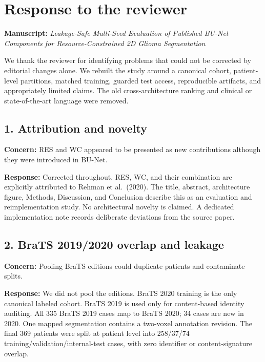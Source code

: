 \documentclass[
  10pt,
  letterpaper,
]{article}
\author{}
\date{}
\begin{document}
\section{Response to the reviewer}\label{response-to-the-reviewer}

\textbf{Manuscript:} \emph{Leakage-Safe Multi-Seed Evaluation of
Published BU-Net Components for Resource-Constrained 2D Glioma
Segmentation}

We thank the reviewer for identifying problems that could not be
corrected by editorial changes alone. We rebuilt the study around a
canonical cohort, patient-level partitions, matched training, guarded
test access, reproducible artifacts, and appropriately limited claims.
The old cross-architecture ranking and clinical or state-of-the-art
language were removed.

\subsection{1. Attribution and novelty}\label{attribution-and-novelty}

\textbf{Concern:} RES and WC appeared to be presented as new
contributions although they were introduced in BU-Net.

\textbf{Response:} Corrected throughout. RES, WC, and their combination
are explicitly attributed to Rehman et al.~(2020). The title, abstract,
architecture figure, Methods, Discussion, and Conclusion describe this
as an evaluation and reimplementation study. No architectural novelty is
claimed. A dedicated implementation note records deliberate deviations
from the source paper.

\subsection{2. BraTS 2019/2020 overlap and
leakage}\label{brats-20192020-overlap-and-leakage}

\textbf{Concern:} Pooling BraTS editions could duplicate patients and
contaminate splits.

\textbf{Response:} We did not pool the editions. BraTS 2020 training is
the only canonical labeled cohort. BraTS 2019 is used only for
content-based identity auditing. All 335 BraTS 2019 cases map to BraTS
2020; 34 cases are new in 2020. One mapped segmentation contains a
two-voxel annotation revision. The final 369 patients were split at
patient level into 258/37/74 training/validation/internal-test cases,
with zero identifier or content-signature overlap.
\end{document}
